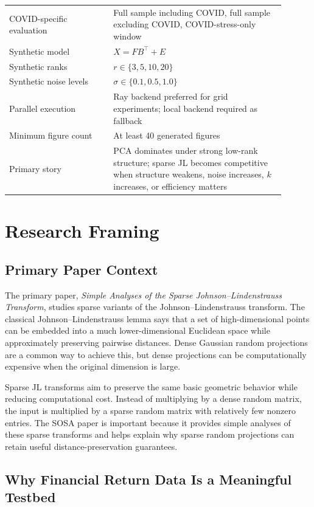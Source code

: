 \documentclass[11pt]{article}
\begin{document}
\begin{table}[H]
\begin{tabular}{p{0.34\linewidth} p{0.56\linewidth}}
COVID-specific evaluation & Full sample including COVID, full sample excluding COVID, COVID-stress-only window \\
Synthetic model & $X = F B^\top + E$ \\
Synthetic ranks & $r \in \{3, 5, 10, 20\}$ \\
Synthetic noise levels & $\sigma \in \{0.1, 0.5, 1.0\}$ \\
Parallel execution & Ray backend preferred for grid experiments; local backend required as fallback \\
Minimum figure count & At least 40 generated figures \\
Primary story & PCA dominates under strong low-rank structure; sparse JL becomes competitive when structure weakens, noise increases, $k$ increases, or efficiency matters \\
\bottomrule
\end{tabular}
\end{table}

\section{Research Framing}

\subsection{Primary Paper Context}

The primary paper, \emph{Simple Analyses of the Sparse Johnson--Lindenstrauss Transform}, studies sparse variants of the Johnson--Lindenstrauss transform. The classical Johnson--Lindenstrauss lemma says that a set of high-dimensional points can be embedded into a much lower-dimensional Euclidean space while approximately preserving pairwise distances. Dense Gaussian random projections are a common way to achieve this, but dense projections can be computationally expensive when the original dimension is large.

Sparse JL transforms aim to preserve the same basic geometric behavior while reducing computational cost. Instead of multiplying by a dense random matrix, the input is multiplied by a sparse random matrix with relatively few nonzero entries. The SOSA paper is important because it provides simple analyses of these sparse transforms and helps explain why sparse random projections can retain useful distance-preservation guarantees.

\subsection{Why Financial Return Data Is a Meaningful Testbed}
\end{document}
